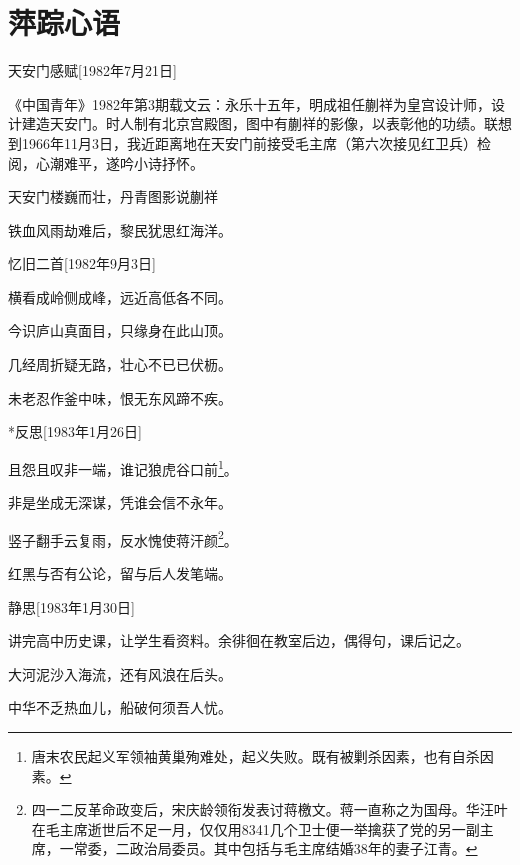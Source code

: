 \documentclass[../../dazhuan.tex]{subfiles}
\begin{document}
	\chapter*{萍踪心语}
	
\begin{poem}{天安门感赋}[1982年7月21日]
\begin{xpref}
《中国青年》1982年第3期载文云：永乐十五年，明成祖任蒯祥为皇宫设计师，设计建造天安门。时人制有北京宫殿图，图中有蒯祥的影像，以表彰他的功绩。联想到1966年11月3日，我近距离地在天安门前接受毛主席（第六次接见红卫兵）检阅，心潮难平，遂吟小诗抒怀。
\end{xpref}
天安门楼巍而壮，丹青图影说蒯祥

铁血风雨劫难后，黎民犹思红海洋。
\end{poem}

\begin{poem}{忆旧二首}[1982年9月3日]
\subtitle{一\\改苏轼题西林壁抒怀}

横看成岭侧成峰，远近高低各不同。

今识庐山真面目，只缘身在此山顶。

\subtitle{二}

几经周折疑无路，壮心不已已伏枥。

未老忍作釜中味，恨无东风蹄不疾。
\end{poem}

\clearpage

\begin{poem}*{反思}[1983年1月26日]
	
且怨且叹非一端，谁记狼虎谷口前\footnote{唐末农民起义军领袖黄巢殉难处，起义失败。既有被剿杀因素，也有自杀因素。}。

非是坐成无深谋，凭谁会信不永年。

竖子翻手云复雨，反水愧使蒋汗颜\footnote{四一二反革命政变后，宋庆龄领衔发表讨蒋檄文。蒋一直称之为国母。华汪叶在毛主席逝世后不足一月，仅仅用8341几个卫士便一举擒获了党的另一副主席，一常委，二政治局委员。其中包括与毛主席结婚38年的妻子江青。}。

红黑与否有公论，留与后人发笔端。
\end{poem}

\begin{poem}{静思}[1983年1月30日]
\begin{xpref}
讲完高中历史课，让学生看资料。余徘徊在教室后边，偶得句，课后记之。
\end{xpref}

大河泥沙入海流，还有风浪在后头。

中华不乏热血儿，船破何须吾人忧。
\end{poem}
\end{document}
